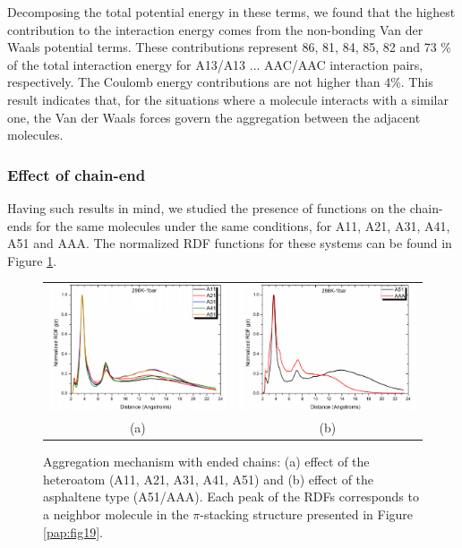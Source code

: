 Decomposing the total potential energy in these terms, we found that the highest contribution to the interaction energy comes from the non-bonding Van der Waals potential terms. These contributions represent 86, 81, 84, 85, 82 and 73 \% of the total interaction energy for A13/A13 ... AAC/AAC interaction pairs, respectively. The Coulomb energy contributions are not higher than 4\%. This result indicates that, for the situations where a molecule interacts with a similar one, the Van der Waals forces govern the aggregation between the adjacent molecules. 

\subsubsection{Effect of chain-end}

Having such results in mind, we studied the presence of  functions on the chain-ends for the same molecules under the same conditions, for A11, A21, A31, A41, A51 and AAA. The normalized RDF functions for these systems can be found in Figure \ref{pap:fig20}.

\begin{figure}[h]
	\begin{tabular}{cc}
		\includegraphics[width=0.45\columnwidth]{image/04a} & 	
		\includegraphics[width=0.45\columnwidth]{image/04b} \\
		(a) & (b) \\
	\end{tabular}
	\caption{Aggregation mechanism with  ended chains: (a) effect of the heteroatom (A11, A21, A31, A41, A51)  and (b) effect of the asphaltene type (A51/AAA). Each peak of the RDFs corresponds to a neighbor molecule in the $\pi$-stacking structure presented in Figure \ref{pap:fig19}.}
	\label{pap:fig20}
\end{figure}


